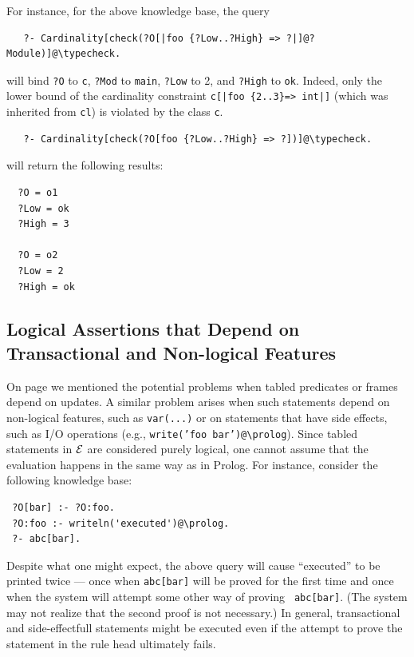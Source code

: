 \documentclass[11pt]{article}
\newcommand{\ERGO}{\mbox{\ensuremath{\cal{E}}\smaller{{\sc{RGO}}}}\xspace}
\newcommand{\FLSYSTEM}{\ERGO}
\newcommand{\bs}{\textbackslash}
\begin{document}
\begin{itemize}
  For instance, for the above knowledge base, the query
\begin{verbatim}
   ?- Cardinality[check(?O[|foo {?Low..?High} => ?|]@?Module)]@\typecheck.  
\end{verbatim}
  will bind {\tt ?O} to {\tt c}, {\tt ?Mod} to {\tt main}, {\tt ?Low} to 2,
  and {\tt ?High} to {\tt ok}. Indeed, only the lower bound of the
  cardinality constraint {\tt c[|foo \{2..3\}=> int|]} (which was inherited from
  {\tt cl}) is violated by the class {\tt c}.
\begin{verbatim}
   ?- Cardinality[check(?O[foo {?Low..?High} => ?])]@\typecheck.
\end{verbatim}
  will return the following results:
\begin{verbatim}
  ?O = o1
  ?Low = ok
  ?High = 3

  ?O = o2
  ?Low = 2
  ?High = ok
\end{verbatim}

\end{itemize}



\subsection{Logical Assertions that Depend on Transactional and Non-logical Features}

On page \pageref{page-depchk} we mentioned the potential problems when
tabled predicates or frames depend on updates. A similar problem
arises when such statements depend on non-logical features, such as
{\tt var(...)} or on statements that have side effects, such as I/O
operations (e.g., {\tt write('foo bar')@\bs{}prolog}). Since tabled statements
in \FLSYSTEM are considered purely logical, one cannot assume that the
evaluation happens in the same way as in Prolog.
For instance, consider the following knowledge base:
\begin{verbatim}
 ?O[bar] :- ?O:foo.
 ?O:foo :- writeln('executed')@\prolog.  
 ?- abc[bar].
\end{verbatim}
Despite what one might expect, the above query will cause ``executed'' to
be printed twice --- once when {\tt abc[bar]} will be proved for the first
time and once when the system will attempt some other way of proving {\tt
  abc[bar]}. (The system may not realize that the second proof is not
necessary.) In general, transactional and side-effectfull statements 
might be executed even if the attempt to prove the statement in the rule
head ultimately fails.
\end{document}
